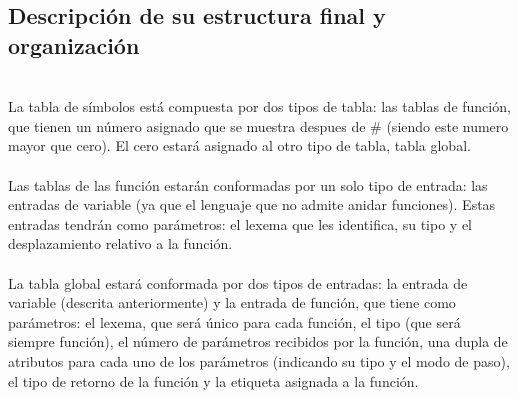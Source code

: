 \documentclass{article}[a4paper]
\begin{document}
\subsection{Descripción de su estructura final y organización}\\
La tabla de símbolos está compuesta por dos tipos de tabla: las tablas de función, que tienen un número asignado que se muestra despues de \# (siendo este numero mayor que cero). El cero estará asignado al otro tipo de tabla, tabla global.\\ \\
Las tablas de las función estarán conformadas por un solo tipo de entrada: las entradas de variable (ya que el lenguaje que no admite anidar funciones). Estas entradas tendrán como parámetros: el lexema que les identifica, su tipo y el desplazamiento relativo a la función.\\ \\
La tabla global estará conformada por dos tipos de entradas: la entrada de variable (descrita anteriormente) y la entrada de función, que tiene como parámetros: el lexema, que será único para cada función, el tipo (que será siempre función), el número de parámetros recibidos por la función, una dupla de atributos para cada uno de los parámetros (indicando su tipo y el modo de paso), el tipo de retorno de la función y la etiqueta asignada a la función.\\

\newpage
\end{document}
